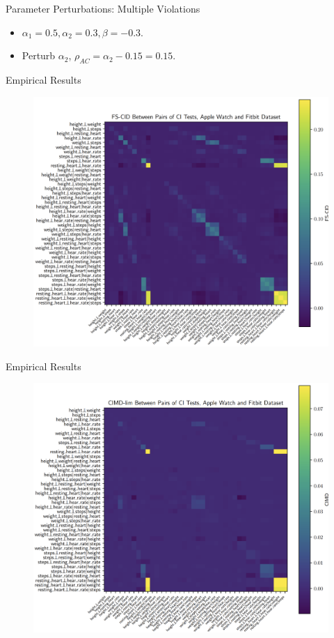 \documentclass{beamer}
\begin{document}
\begin{frame}{Parameter Perturbations: Multiple Violations}
	\begin{itemize}
		\item $ \alpha_1 = 0.5, \alpha_2 = 0.3, \beta = -0.3 $.
		\item Perturb $ \alpha_2 $, $ \rho_{AC} = \alpha_2 - 0.15 = 0.15 $.
	\end{itemize}
\end{frame}


\begin{frame}{Empirical Results}
	\begin{figure}
		\includegraphics[scale=0.12]{imgs/empirical1.png}
	\end{figure}
\end{frame}

\begin{frame}{Empirical Results}
	\begin{figure}
		\includegraphics[scale=0.12]{imgs/empirical2.png}
	\end{figure}
\end{frame}
\end{document}

